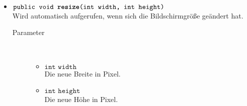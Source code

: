 \begin{description}
\begin{itemize}
		\item $\texttt{public void \textbf{resize}(int width, int height)}$ \\ Wird automatisch aufgerufen, wenn sich die Bildschirmgröße geändert hat.
		\begin{description}
			\item[Parameter] \hfill \\
			\vspace{-.8cm}
			\begin{itemize}
				\item $\texttt{int width}$ \\ Die neue Breite in Pixel.
				\item $\texttt{int height}$ \\ Die neue Höhe in Pixel.
			\end{itemize}
		\end{description}
	\end{itemize}
\end{description}